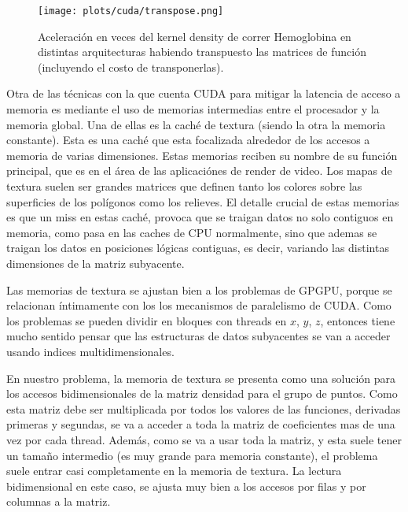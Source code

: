 
\begin{figure}[htbp]
   \centering
   \texttt{[image: plots/cuda/transpose.png]}
   \caption{Aceleraci\'on en veces del kernel density de correr Hemoglobina en distintas arquitecturas habiendo transpuesto las matrices
   de funci\'on (incluyendo el costo de transponerlas).}
   \label{plt:transpose}
\end{figure}

Otra de las t\'ecnicas con la que cuenta CUDA para mitigar la latencia de acceso a memoria
es mediante el uso de memorias intermedias entre el procesador y la memoria global. Una de ellas es
la cach\'e de textura (siendo la otra la memoria constante). Esta es una cach\'e que
esta focalizada alrededor de los accesos a memoria de varias dimensiones.
Estas memorias reciben su nombre de su funci\'on principal, que es en el \'area de las
aplicaci\'ones de render de video. Los mapas de textura suelen ser grandes matrices que definen
tanto los colores sobre las superficies de los pol\'igonos como los relieves.
El detalle crucial de estas memorias es que un miss en estas cach\'e, provoca
que se traigan datos no solo contiguos en memoria, como pasa en las caches de
CPU normalmente, sino que ademas se traigan los datos en posiciones l\'ogicas contiguas,
es decir, variando las distintas dimensiones de la matriz subyacente.

Las memorias de textura se ajustan bien a los problemas de GPGPU, porque se relacionan
\'intimamente con los los mecanismos de paralelismo de CUDA. Como los problemas se pueden
dividir en bloques con threads en $x$, $y$, $z$, entonces tiene mucho sentido pensar
que las estructuras de datos subyacentes se van a acceder usando indices multidimensionales.

En nuestro problema, la memoria de textura se presenta como una soluci\'on para
los accesos bidimensionales de la matriz densidad para el grupo de puntos.
Como esta matriz debe ser multiplicada por todos los valores de las funciones,
derivadas primeras y segundas, se va a acceder a toda la matriz de coeficientes mas de
una vez por cada thread. Adem\'as, como se va a usar toda la matriz, y esta suele
tener un tama\~no intermedio (es muy grande para memoria constante), el problema
suele entrar casi completamente en la memoria de textura.
La lectura bidimensional en este caso, se ajusta muy bien a los accesos por filas
y por columnas a la matriz.

